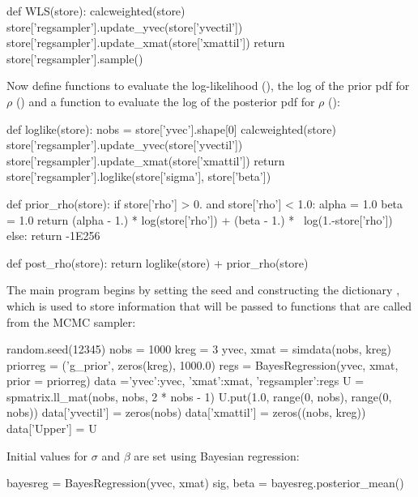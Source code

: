 \documentclass[article]{jss}
\begin{document}
\begin{Code}
def WLS(store):
    calcweighted(store)
    store['regsampler'].update_yvec(store['yvectil'])
    store['regsampler'].update_xmat(store['xmattil'])
    return store['regsampler'].sample()
\end{Code}

Now define functions to evaluate the log-likelihood (),
the log of the prior pdf for $\rho$ () and a function to evaluate the log of the posterior pdf for $\rho$ ():

\begin{Code}
def loglike(store):
    nobs = store['yvec'].shape[0]
    calcweighted(store)
    store['regsampler'].update_yvec(store['yvectil'])
    store['regsampler'].update_xmat(store['xmattil'])
    return store['regsampler'].loglike(store['sigma'], store['beta'])

def prior_rho(store):
    if store['rho'] > 0. and store['rho'] < 1.0:
        alpha = 1.0
        beta = 1.0
        return (alpha - 1.) * log(store['rho']) + (beta - 1.) * \
          log(1.-store['rho'])
    else:
        return -1E256

def post_rho(store):
    return loglike(store) + prior_rho(store)
\end{Code}




The main program begins by setting the seed and constructing the
\proglang{Python} dictionary \code{data}, which is used to store
information that will be passed to functions that are called from the
MCMC sampler:

\begin{Code}
random.seed(12345)
nobs = 1000
kreg = 3
yvec, xmat = simdata(nobs, kreg)
priorreg = ('g_prior', zeros(kreg), 1000.0)
regs = BayesRegression(yvec, xmat, prior = priorreg)
data ={'yvec':yvec, 'xmat':xmat, 'regsampler':regs}
U = spmatrix.ll_mat(nobs, nobs, 2 * nobs - 1)
U.put(1.0, range(0, nobs), range(0, nobs))
data['yvectil'] = zeros(nobs)
data['xmattil'] = zeros((nobs, kreg))
data['Upper'] = U
\end{Code}

Initial values for $\sigma$ and $\beta$ are set using Bayesian regression:
\begin{Code}
bayesreg = BayesRegression(yvec, xmat)
sig, beta = bayesreg.posterior_mean()
\end{Code}
\end{document}
